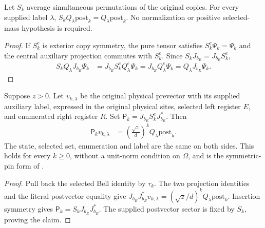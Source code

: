 \begin{theorem}
    \label{thm:selected_bell_post_sector_symmetry}
    \leanok
    Let $S_k$ average simultaneous permutations of the original copies.
    For every supplied label $\lambda$,
    $S_kQ_\lambda\mathrm{post}_k=Q_\lambda\mathrm{post}_k$.
    No normalization or positive selected-mass hypothesis is required.
\end{theorem}
\begin{proof}
    \leanok
    If $S^e_k$ is exterior copy symmetry, the pure tensor satisfies
    $S^e_k\Psi_k=\Psi_k$ and the central auxiliary projection commutes
    with $S^e_k$. Since $S_kJ_{b_E}=J_{b_E}S^e_k$,
    \begin{align*}
        S_kQ_\lambda J_{b_E}\Psi_k
        &=J_{b_E}S^e_kQ^e_\lambda\Psi_k
          =J_{b_E}Q^e_\lambda\Psi_k
          =Q_\lambda J_{b_E}\Psi_k.
    \end{align*}
\end{proof}

\begin{theorem}
    \label{thm:selected_bell_post_exact_pin}
    \leanok
    Suppose $z>0$. Let $v_{k,\lambda}$ be the original physical prevector
    with its supplied auxiliary label, expressed in the original physical
    sites, selected left register $E$, and enumerated right register $R$.
    Set $\mathsf P_k=J_{b_E}S^e_kJ_{b_E}^*$. Then
    \begin{align*}
        \mathsf P_kv_{k,\lambda}
        &=\left(\frac{\sqrt z}{d}\right)^k
            Q_\lambda\mathrm{post}_k.
    \end{align*}
    The state, selected set, enumeration and label are the same on both
    sides. This holds for every $k\ge0$, without a unit-norm condition on
    $\Omega$, and is the symmetric-pin form of
    \cite[\texttt{07-comparators.tex}, lines 283--290]{OpenAI2026AreaLaw}.
\end{theorem}
\begin{proof}
    \leanok
    Pull back the selected Bell identity by $\tau_k$. The two projection
    identities and the literal postvector equality give
    $J_{b_E}J_{b_E}^*v_{k,\lambda}
      =(\sqrt z/d)^kQ_\lambda\mathrm{post}_k$.
    Insertion symmetry gives
    $\mathsf P_k=S_kJ_{b_E}J_{b_E}^*$.
    The supplied postvector sector is fixed by $S_k$, proving the claim.
\end{proof}


